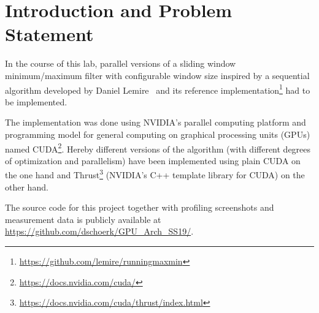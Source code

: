 
\section{Introduction and Problem Statement}

In the course of this lab, parallel versions of a sliding window minimum/maximum filter with configurable window size inspired by a sequential algorithm developed by Daniel Lemire~\cite{lemire2006streaming} and its reference implementation\footnote{\url{https://github.com/lemire/runningmaxmin}} had to be implemented.

The implementation was done using NVIDIA's parallel computing platform and programming model for general computing on graphical processing units (GPUs) named CUDA\footnote{\url{https://docs.nvidia.com/cuda/}}. Hereby different versions of the algorithm (with different degrees of optimization and parallelism) have been implemented using plain CUDA on the one hand and Thrust\footnote{\url{https://docs.nvidia.com/cuda/thrust/index.html}} (NVIDIA's C++ template library for CUDA) on the other hand.
 
The source code for this project together with profiling screenshots and measurement data is publicly available at \url{https://github.com/dschoerk/GPU_Arch_SS19/}.